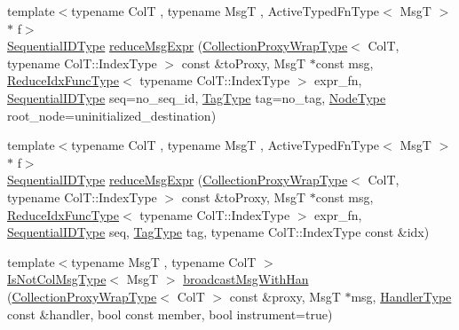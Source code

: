 \begin{DoxyCompactItemize}
{\footnotesize template$<$typename ColT , typename MsgT , Active\+Typed\+Fn\+Type$<$ Msg\+T $>$ $\ast$ f$>$ }\\\hyperlink{namespacevt_a3063d4db3b879d6dd2c7b8d50995c7f6}{Sequential\+I\+D\+Type} \hyperlink{structvt_1_1vrt_1_1collection_1_1_collection_manager_a24e88e79e220be4b8933342576246630}{reduce\+Msg\+Expr} (\hyperlink{structvt_1_1vrt_1_1collection_1_1_collection_manager_a56458ed7f9bb22b631b9b3a745f42f94}{Collection\+Proxy\+Wrap\+Type}$<$ ColT, typename Col\+T\+::\+Index\+Type $>$ const \&to\+Proxy, MsgT $\ast$const msg, \hyperlink{structvt_1_1vrt_1_1collection_1_1_collection_manager_a47a3227ae0195c15187e8dc8762f66c4}{Reduce\+Idx\+Func\+Type}$<$ typename Col\+T\+::\+Index\+Type $>$ expr\+\_\+fn, \hyperlink{namespacevt_a3063d4db3b879d6dd2c7b8d50995c7f6}{Sequential\+I\+D\+Type} seq=no\+\_\+seq\+\_\+id, \hyperlink{namespacevt_a84ab281dae04a52a4b243d6bf62d0e52}{Tag\+Type} tag=no\+\_\+tag, \hyperlink{namespacevt_a866da9d0efc19c0a1ce79e9e492f47e2}{Node\+Type} root\+\_\+node=uninitialized\+\_\+destination)
\item 
{\footnotesize template$<$typename ColT , typename MsgT , Active\+Typed\+Fn\+Type$<$ Msg\+T $>$ $\ast$ f$>$ }\\\hyperlink{namespacevt_a3063d4db3b879d6dd2c7b8d50995c7f6}{Sequential\+I\+D\+Type} \hyperlink{structvt_1_1vrt_1_1collection_1_1_collection_manager_a10a8bcd896b8d2ccdc27c03302ea2001}{reduce\+Msg\+Expr} (\hyperlink{structvt_1_1vrt_1_1collection_1_1_collection_manager_a56458ed7f9bb22b631b9b3a745f42f94}{Collection\+Proxy\+Wrap\+Type}$<$ ColT, typename Col\+T\+::\+Index\+Type $>$ const \&to\+Proxy, MsgT $\ast$const msg, \hyperlink{structvt_1_1vrt_1_1collection_1_1_collection_manager_a47a3227ae0195c15187e8dc8762f66c4}{Reduce\+Idx\+Func\+Type}$<$ typename Col\+T\+::\+Index\+Type $>$ expr\+\_\+fn, \hyperlink{namespacevt_a3063d4db3b879d6dd2c7b8d50995c7f6}{Sequential\+I\+D\+Type} seq, \hyperlink{namespacevt_a84ab281dae04a52a4b243d6bf62d0e52}{Tag\+Type} tag, typename Col\+T\+::\+Index\+Type const \&idx)
\item 
{\footnotesize template$<$typename MsgT , typename ColT $>$ }\\\hyperlink{structvt_1_1vrt_1_1collection_1_1_collection_manager_ae376deeefd4f89a0b1c93849977715d9}{Is\+Not\+Col\+Msg\+Type}$<$ MsgT $>$ \hyperlink{structvt_1_1vrt_1_1collection_1_1_collection_manager_aa4f27486773ea5bec481099223ab12d1}{broadcast\+Msg\+With\+Han} (\hyperlink{structvt_1_1vrt_1_1collection_1_1_collection_manager_a56458ed7f9bb22b631b9b3a745f42f94}{Collection\+Proxy\+Wrap\+Type}$<$ ColT $>$ const \&proxy, MsgT $\ast$msg, \hyperlink{namespacevt_af64846b57dfcaf104da3ef6967917573}{Handler\+Type} const \&handler, bool const member, bool instrument=true)

\end{DoxyCompactItemize}
